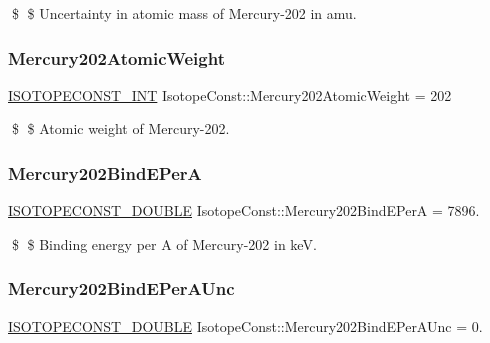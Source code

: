 \$ \$ Uncertainty in atomic mass of Mercury-\/202 in amu. \mbox{\label{group___isotope_const-_mercury-_hg202_ga04ce522408fe7205dd2242346e088d34}} 
\subsubsection{\texorpdfstring{Mercury202\+Atomic\+Weight}{Mercury202AtomicWeight}}
{\footnotesize\ttfamily \mbox{\hyperlink{group___isotope_const-_macros_ga5f18360b3e99483a35c32d789e62621c}{I\+S\+O\+T\+O\+P\+E\+C\+O\+N\+S\+T\+\_\+\+I\+NT}} Isotope\+Const\+::\+Mercury202\+Atomic\+Weight = 202}

\$ \$ Atomic weight of Mercury-\/202. \mbox{\label{group___isotope_const-_mercury-_hg202_gad42f3801290841975d503d4bc8b838d9}} 
\subsubsection{\texorpdfstring{Mercury202\+Bind\+E\+PerA}{Mercury202BindEPerA}}
{\footnotesize\ttfamily \mbox{\hyperlink{group___isotope_const-_macros_ga8f45a7272ce02c0b4c65c44636ed719a}{I\+S\+O\+T\+O\+P\+E\+C\+O\+N\+S\+T\+\_\+\+D\+O\+U\+B\+LE}} Isotope\+Const\+::\+Mercury202\+Bind\+E\+PerA = 7896.}

\$ \$ Binding energy per A of Mercury-\/202 in keV. \mbox{\label{group___isotope_const-_mercury-_hg202_ga231a3d84837d0ec942efcd1bca0b3425}} 
\subsubsection{\texorpdfstring{Mercury202\+Bind\+E\+Per\+A\+Unc}{Mercury202BindEPerAUnc}}
{\footnotesize\ttfamily \mbox{\hyperlink{group___isotope_const-_macros_ga8f45a7272ce02c0b4c65c44636ed719a}{I\+S\+O\+T\+O\+P\+E\+C\+O\+N\+S\+T\+\_\+\+D\+O\+U\+B\+LE}} Isotope\+Const\+::\+Mercury202\+Bind\+E\+Per\+A\+Unc = 0.}


